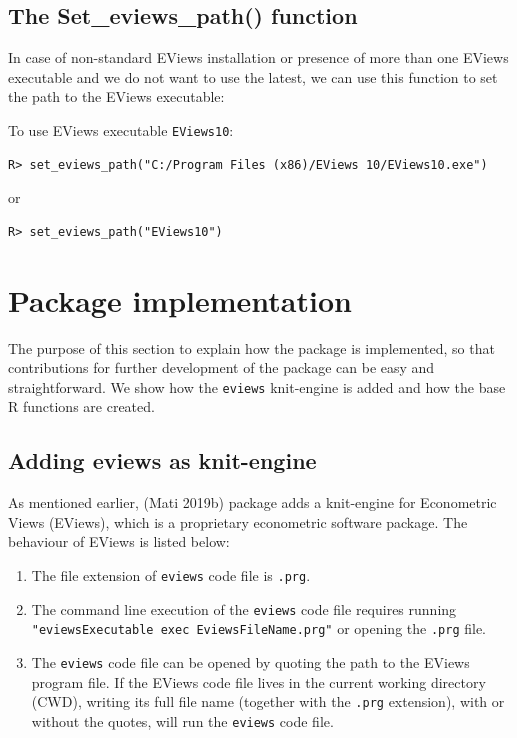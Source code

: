 \hypertarget{the-set_eviews_path-function}{%
\subsection{The Set\_eviews\_path() function}\label{the-set_eviews_path-function}}

In case of non-standard EViews installation or presence of more than one EViews executable and we do not want to use the latest, we can use this function to set the path to the EViews executable:

To use EViews executable \texttt{EViews10}:

\begin{verbatim}
R> set_eviews_path("C:/Program Files (x86)/EViews 10/EViews10.exe")
\end{verbatim}

or

\begin{verbatim}
R> set_eviews_path("EViews10")
\end{verbatim}

\hypertarget{sec-implementation}{%
\section{Package implementation}\label{sec-implementation}}

The purpose of this section to explain how the package is implemented, so that contributions for further development of the package can be easy and straightforward. We show how the \texttt{eviews} knit-engine is added and how the base R functions are created.

\hypertarget{sec-knit-engine}{%
\subsection{Adding eviews as knit-engine}\label{sec-knit-engine}}

As mentioned earlier,  (Mati 2019b) package adds a knit-engine for Econometric Views (EViews), which is a proprietary econometric software package. The behaviour of EViews is listed below:

\begin{enumerate}
\def\labelenumi{\arabic{enumi}.}
\item
  The file extension of \texttt{eviews} code file is \texttt{.prg}.
\item
  The command line execution of the \texttt{eviews} code file requires running \texttt{"eviewsExecutable\ exec\ EviewsFileName.prg"} or opening the \texttt{.prg} file.
\item
  The \texttt{eviews} code file can be opened by quoting the path to the EViews program file. If the EViews code file lives in the current working directory (CWD), writing its full file name (together with the \texttt{.prg} extension), with or without the quotes, will run the \texttt{eviews} code file.
\end{enumerate}

